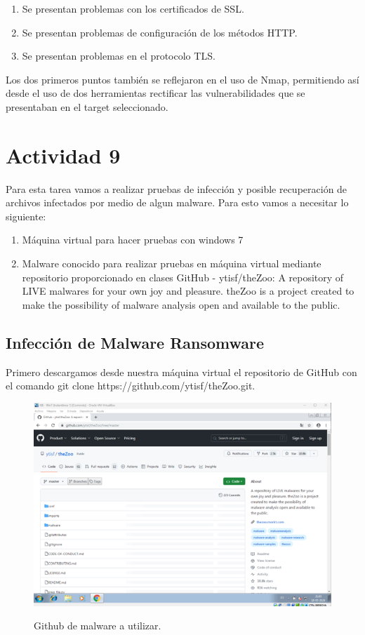 \documentclass[stu, 11pt, letterpaper, donotrepeattitle, floatsintext, natbib]{apa7}
\begin{document}
\begin{enumerate}
  \item Se presentan problemas con los certificados de SSL.
  \item  Se presentan problemas de configuración de los métodos HTTP.
  \item  Se presentan problemas en el protocolo TLS.
\end{enumerate}

Los dos primeros puntos también se reflejaron en el uso de Nmap, permitiendo así desde el uso de dos herramientas rectificar las vulnerabilidades que se presentaban en el target seleccionado.

\newpage

\section{\large Actividad 9}

Para esta tarea vamos a realizar pruebas de infección y posible recuperación de archivos infectados por medio de algun malware. Para esto vamos a necesitar lo siguiente:

\begin{enumerate}
  \item  Máquina virtual para hacer pruebas con windows 7  
  \item  Malware conocido para realizar pruebas en máquina virtual mediante repositorio proporcionado en clases GitHub - ytisf/theZoo: A repository of LIVE malwares for your own joy and pleasure. theZoo is a project created to make the possibility of malware analysis open and available to the public.
\end{enumerate}

\subsection{Infección de Malware Ransomware} 

Primero descargamos desde nuestra máquina virtual el repositorio de GitHub con el comando git clone https://github.com/ytisf/theZoo.git.

\begin{figure}[H]
    \centering
    \caption{Github de malware a utilizar.}
    \includegraphics[width=0.75\linewidth]{ram1.png} %
    \label{fig:OverallEffect}
\end{figure}
\end{document}

